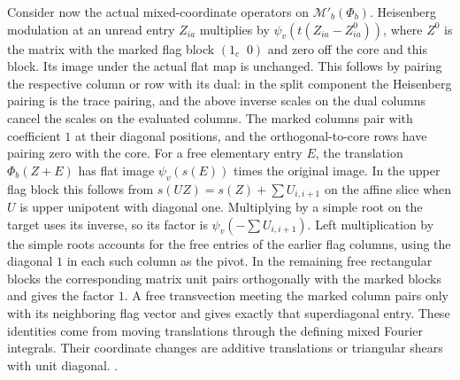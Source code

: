 Consider now the actual mixed-coordinate operators on
\(\mathcal M'_b(\Phi_b)\). Heisenberg modulation at an unread
entry \(Z_{ia}\) multiplies by
\(\psi_v(t(Z_{ia}-Z^0_{ia}))\), where \(Z^0\) is the matrix
with the marked flag block \((1_c\;\;0)\) and zero off the
core and this block. Its image under the actual flat map is
unchanged. This follows by pairing the respective column or row
with its dual: in the split component the Heisenberg pairing is
the trace pairing, and the above inverse scales on the dual
columns cancel the scales on the evaluated columns. The marked
columns pair with coefficient \(1\) at their diagonal positions,
and the orthogonal-to-core rows have pairing zero with the core.
For a free elementary entry \(E\), the translation
\(\Phi_b(Z+E)\) has flat image \(\psi_v(s(E))\) times the
original image. In the upper flag block this follows from
\(s(UZ)=s(Z)+\sum U_{i,i+1}\) on the affine slice when \(U\)
is upper unipotent with diagonal one. Multiplying by a simple
root on the target uses its inverse, so its factor is
\(\psi_v(-\sum U_{i,i+1})\). Left multiplication by the simple
roots accounts for the free entries of the earlier flag
columns, using the diagonal \(1\) in each such column as the
pivot. In the remaining free rectangular blocks the corresponding
matrix unit pairs orthogonally with the marked blocks and gives
the factor \(1\). A free transvection meeting the marked
column pairs only with its neighboring flag vector and gives
exactly that superdiagonal entry. These identities come from
moving translations through the defining mixed Fourier
integrals. Their coordinate changes are additive translations
or triangular shears with unit diagonal.
.


